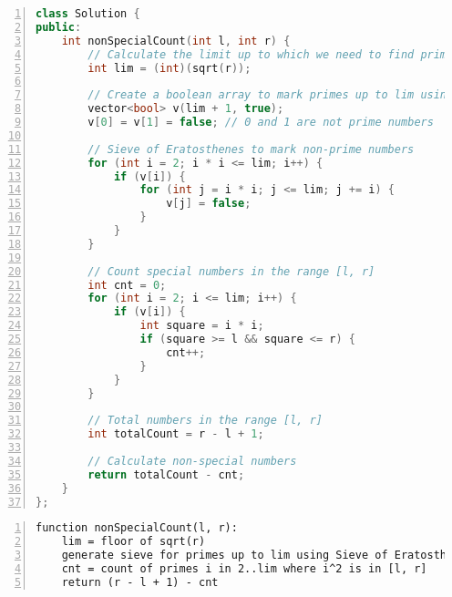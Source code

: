 \begin{figure*}
\centering
\begin{lstlisting}[breaklines=true, language=C++, frame=shadowbox, numbers=left,]
class Solution {
public:
    int nonSpecialCount(int l, int r) {
        // Calculate the limit up to which we need to find prime numbers
        int lim = (int)(sqrt(r));

        // Create a boolean array to mark primes up to lim using Sieve of Eratosthenes
        vector<bool> v(lim + 1, true);
        v[0] = v[1] = false; // 0 and 1 are not prime numbers

        // Sieve of Eratosthenes to mark non-prime numbers
        for (int i = 2; i * i <= lim; i++) {
            if (v[i]) {
                for (int j = i * i; j <= lim; j += i) {
                    v[j] = false;
                }
            }
        }

        // Count special numbers in the range [l, r]
        int cnt = 0;
        for (int i = 2; i <= lim; i++) {
            if (v[i]) {
                int square = i * i;
                if (square >= l && square <= r) {
                    cnt++;
                }
            }
        }

        // Total numbers in the range [l, r]
        int totalCount = r - l + 1;

        // Calculate non-special numbers
        return totalCount - cnt;
    }
};
\end{lstlisting}
\label{lst:cpp-simp}
\end{figure*}

\begin{figure*}
\centering
\begin{lstlisting}[breaklines=true, frame=shadowbox, numbers=left,]
function nonSpecialCount(l, r):
    lim = floor of sqrt(r)
    generate sieve for primes up to lim using Sieve of Eratosthenes
    cnt = count of primes i in 2..lim where i^2 is in [l, r]
    return (r - l + 1) - cnt
\end{lstlisting}
\label{lst:pseudo-simp}
\end{figure*}
